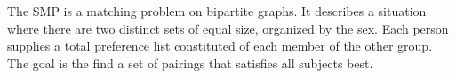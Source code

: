The SMP is a matching problem on bipartite graphs. It describes a situation where there are two distinct sets of equal size, organized by the sex. Each person supplies a total preference list constituted of each member of the other group. The goal is the find a set of pairings that satisfies all subjects best. \cite{Gusfield:1989}
